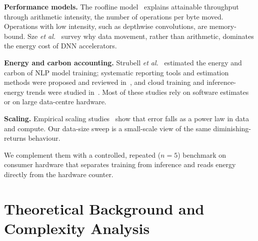 \documentclass[conference]{IEEEtran}
\begin{document}
\textbf{Performance models.} The roofline model~\cite{williams2009roofline} explains attainable throughput through arithmetic intensity, the number of operations per byte moved. Operations with low intensity, such as depthwise convolutions, are memory-bound. Sze \emph{et al.}~\cite{sze2017efficient} survey why data movement, rather than arithmetic, dominates the energy cost of DNN accelerators.

\textbf{Energy and carbon accounting.} Strubell \emph{et al.}~\cite{strubell2019energy} estimated the energy and carbon of NLP model training; systematic reporting tools and estimation methods were proposed and reviewed in~\cite{henderson2020systematic,lacoste2019quantifying,garciamartin2019estimation}, and cloud training and inference-energy trends were studied in~\cite{dodge2022measuring,desislavov2023trends}. Most of these studies rely on software estimates or on large data-centre hardware.

\textbf{Scaling.} Empirical scaling studies~\cite{hestness2017scaling,kaplan2020scaling} show that error falls as a power law in data and compute. Our data-size sweep is a small-scale view of the same diminishing-returns behaviour.

We complement them with a controlled, repeated ($n{=}5$) benchmark on consumer hardware that separates training from inference and reads energy directly from the hardware counter.

\section{Theoretical Background and Complexity Analysis}
\end{document}
